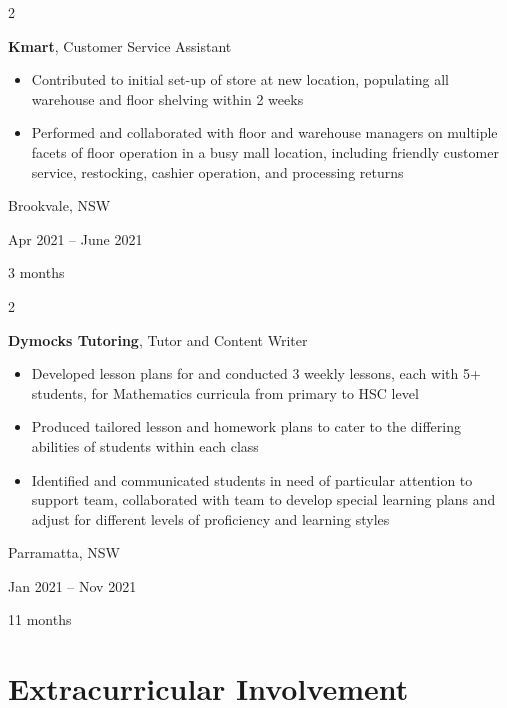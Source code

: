 \documentclass[10pt, a4paper]{article}
\newenvironment{highlights}{
    \begin{itemize}[
        topsep=0.10 cm,
        parsep=0.10 cm,
        partopsep=0pt,
        itemsep=0pt,
        leftmargin=0.4 cm + 10pt
    ]
}{
    \end{itemize}
} %
\newenvironment{twocolentry}[2][]{
    \onecolentry
    \def\secondColumn{#2}
    \setcolumnwidth{\fill, 4.5 cm}
    \begin{paracol}{2}
}{
    \switchcolumn \raggedleft \secondColumn
    \end{paracol}
    \endonecolentry
} %
\begin{document}
        \begin{twocolentry}{
            Brookvale, NSW

        Apr 2021 – June 2021

        3 months
        }
            \textbf{Kmart}, Customer Service Assistant
            \begin{highlights}
                \item Contributed to initial set-up of store at new location, populating all warehouse and floor shelving within 2 weeks
                \item Performed and collaborated with floor and warehouse managers on multiple facets of floor operation in a busy mall location, including friendly customer service, restocking, cashier operation, and processing returns
            \end{highlights}
        \end{twocolentry}


        \vspace{0.2 cm}

        \begin{twocolentry}{
            Parramatta, NSW

        Jan 2021 – Nov 2021

        11 months
        }
            \textbf{Dymocks Tutoring}, Tutor and Content Writer
            \begin{highlights}
                \item Developed lesson plans for and conducted 3 weekly lessons, each with 5+ students, for Mathematics curricula from primary to HSC level
                \item Produced tailored lesson and homework plans to cater to the differing abilities of students within each class
                \item Identified and communicated students in need of particular attention to support team, collaborated with team to develop special learning plans and adjust for different levels of proficiency and learning styles
            \end{highlights}
        \end{twocolentry}



    
    \section{Extracurricular Involvement}
\end{document}
